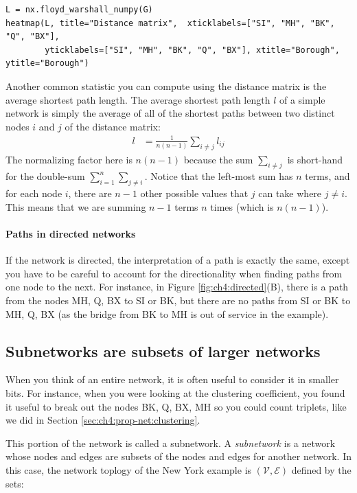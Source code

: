 \begin{lstlisting}[style=python]
L = nx.floyd_warshall_numpy(G)
heatmap(L, title="Distance matrix",  xticklabels=["SI", "MH", "BK", "Q", "BX"],
        yticklabels=["SI", "MH", "BK", "Q", "BX"], xtitle="Borough", ytitle="Borough")
\end{lstlisting}
Another common statistic you can compute using the distance matrix is the {average shortest path length}. The average shortest path length $l$ of a simple network is simply the average of all of the shortest paths between two distinct nodes $i$ and $j$ of the distance matrix:
\begin{align*}
    l &= \frac{1}{n(n - 1)}\sum_{i \neq j} l_{ij}
\end{align*}
The normalizing factor here is $n(n - 1)$ because the sum $\sum_{i \neq j}$ is short-hand for the double-sum $\sum_{i = 1}^n \sum_{j \neq i}$. Notice that the left-most sum has $n$ terms, and for each node $i$, there are $n-1$ other possible values that $j$ can take where $j \neq i$. This means that we are summing $n-1$ terms $n$ times (which is $n (n - 1)$). 

\paragraph{Paths in directed networks}

If the network is directed, the interpretation of a path is exactly the same, except you have to be careful to account for the directionality when finding paths from one node to the next. For instance, in Figure \ref{fig:ch4:directed}(B), there {is} a path from the nodes MH, Q, BX to SI or BK, but there are {no} paths from SI or BK to MH, Q, BX (as the bridge from BK to MH is out of service in the example).

\subsection{Subnetworks are subsets of larger networks}
\label{sec:ch4:prop-net:subnetwork}
When you think of an entire network, it is often useful to consider it in smaller bits. For instance, when you were looking at the clustering coefficient, you found it useful to break out the nodes {BK, Q, BX, MH} so you could count triplets, like we did in Section \ref{sec:ch4:prop-net:clustering}. 

This portion of the network is called a {subnetwork}. A \textit{subnetwork} is a network whose nodes and edges are {subsets} of the nodes and edges for another network. In this case, the  network toplogy of the New York example is $(\mathcal V, \mathcal E)$ defined by the sets:

